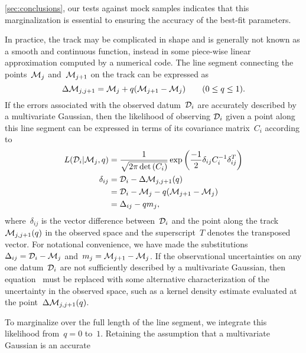 \documentclass[ms.tex]{subfiles}
\begin{document}
\ref{sec:conclusions}, our tests against mock samples indicates that this
marginalization is essential to ensuring the accuracy of the best-fit
parameters.
\par
In practice, the track may be complicated in shape and is generally not known
as a smooth and continuous function, instead in some piece-wise linear
approximation computed by a numerical code.
The line segment connecting the points~$\mathcal{M}_j$ and~$\mathcal{M}_{j + 1}$
on the track can be expressed as
\begin{equation}
\Delta\mathcal{M}_{j,j + 1} = \mathcal{M}_j + q(\mathcal{M}_{j + 1} -
\mathcal{M}_j) \qquad (0 \leq q \leq 1).
\end{equation}
If the errors associated with the observed datum~$\mathcal{D}_i$ are accurately
described by a multivariate Gaussian, then the likelihood of observing
$\mathcal{D}_i$ given a point along this line segment can be expressed in terms
of its covariance matrix~$C_i$ according to
\begin{subequations}\begin{align}
L(\mathcal{D}_i | \mathcal{M}_j, q) &=
\frac{1}{\sqrt{2\pi \det{(C_i)}}}
\exp\left(\frac{-1}{2} \delta_{ij} C_i^{-1} \delta_{ij}^T\right)
\label{eq:l_di_mj_q}
\\
\delta_{ij} &= \mathcal{D}_i - \Delta \mathcal{M}_{j,j + 1}(q)
\\
&= \mathcal{D}_i - \mathcal{M}_j - q(\mathcal{M}_{j + 1} - \mathcal{M}_j)
\\
&= \Delta_{ij} - qm_j,
\label{eq:delta_minus_qmj}
\end{align}\end{subequations}
where~$\delta_{ij}$ is the vector difference between~$\mathcal{D}_i$ and the
point along the track~$\mathcal{M}_{j,j + 1}(q)$ in the observed space and the
superscript~$T$ denotes the transposed vector.
For notational convenience, we have made the substitutions
$\Delta_{ij} = \mathcal{D}_i - \mathcal{M}_j$ and~$m_j = \mathcal{M}_{j + 1} -
\mathcal{M}_j$.
If the observational uncertainties on any one datum~$\mathcal{D}_i$ are not
sufficiently described by a multivariate Gaussian, then
equation~ must be replaced with some alternative
characterization of the uncertainty in the observed space, such as a kernel
density estimate evaluated at the point~$\Delta\mathcal{M}_{j,j + 1}(q)$.
\par
To marginalize over the full length of the line segment, we integrate this
likelihood from~$q = 0$ to~$1$.
Retaining the assumption that a multivariate Gaussian is an accurate
\end{document}
